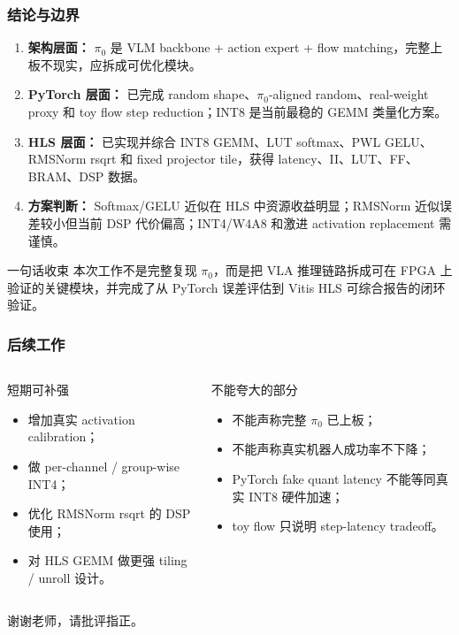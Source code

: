 \documentclass[10pt, aspectratio=169]{beamer}
\newcommand{\piZero}{\texorpdfstring{$\pi_0$}{pi0}\xspace}
\newcommand{\kw}[1]{\textbf{#1}}
\begin{document}
\begin{frame}
  \frametitle{结论与边界}
  \small
  \begin{enumerate}
    \item \kw{架构层面：} \piZero 是 VLM backbone + action expert + flow matching，完整上板不现实，应拆成可优化模块。
    \item \kw{PyTorch 层面：} 已完成 random shape、\piZero-aligned random、real-weight proxy 和 toy flow step reduction；INT8 是当前最稳的 GEMM 类量化方案。
    \item \kw{HLS 层面：} 已实现并综合 INT8 GEMM、LUT softmax、PWL GELU、RMSNorm rsqrt 和 fixed projector tile，获得 latency、II、LUT、FF、BRAM、DSP 数据。
    \item \kw{方案判断：} Softmax/GELU 近似在 HLS 中资源收益明显；RMSNorm 近似误差较小但当前 DSP 代价偏高；INT4/W4A8 和激进 activation replacement 需谨慎。
  \end{enumerate}

  \begin{block}{一句话收束}
    本次工作不是完整复现 \piZero，而是把 VLA 推理链路拆成可在 FPGA 上验证的关键模块，并完成了从 PyTorch 误差评估到 Vitis HLS 可综合报告的闭环验证。
  \end{block}
\end{frame}

\begin{frame}
  \frametitle{后续工作}
  \small
  \begin{columns}[T,onlytextwidth]
    \begin{block}{短期可补强}
      \begin{itemize}
        \item 增加真实 activation calibration；
        \item 做 per-channel / group-wise INT4；
        \item 优化 RMSNorm rsqrt 的 DSP 使用；
        \item 对 HLS GEMM 做更强 tiling / unroll 设计。
      \end{itemize}
    \end{block}

    \begin{alertblock}{不能夸大的部分}
      \begin{itemize}
        \item 不能声称完整 \piZero 已上板；
        \item 不能声称真实机器人成功率不下降；
        \item PyTorch fake quant latency 不能等同真实 INT8 硬件加速；
        \item toy flow 只说明 step-latency tradeoff。
      \end{itemize}
    \end{alertblock}
  \end{columns}

  \vspace{4pt}
  \centering
  \Large 谢谢老师，请批评指正。
\end{frame}
\end{document}
